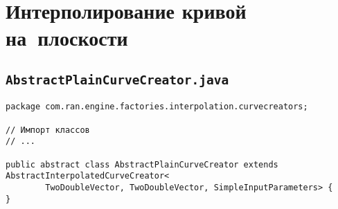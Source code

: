 \chapter{Интерполирование кривой на~плоскости}

\section*{\texttt{AbstractPlainCurveCreator.java}}
\begin{verbatim}
package com.ran.engine.factories.interpolation.curvecreators;

// Импорт классов
// ...

public abstract class AbstractPlainCurveCreator extends AbstractInterpolatedCurveCreator<
        TwoDoubleVector, TwoDoubleVector, SimpleInputParameters> {
}
\end{verbatim}

